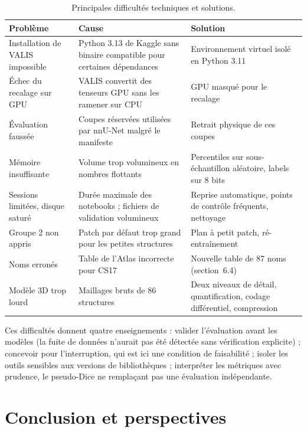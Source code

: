 \documentclass[12pt,a4paper]{report}
\begin{document}
\begin{table}[H]
\centering
\small
\begin{tabular}{p{3.4cm}p{4.9cm}p{5.5cm}}
\toprule
\textbf{Problème} & \textbf{Cause} & \textbf{Solution} \\
\midrule
Installation de VALIS impossible & Python 3.13 de Kaggle sans binaire compatible pour certaines dépendances & Environnement virtuel isolé en Python 3.11 \\
Échec du recalage sur GPU & VALIS convertit des tenseurs GPU sans les ramener sur CPU & GPU masqué pour le recalage \\
Évaluation faussée & Coupes réservées utilisées par nnU-Net malgré le manifeste & Retrait physique de ces coupes \\
Mémoire insuffisante & Volume trop volumineux en nombres flottants & Percentiles sur sous-échantillon aléatoire, labels sur 8 bits \\
Sessions limitées, disque saturé & Durée maximale des notebooks ; fichiers de validation volumineux & Reprise automatique, points de contrôle fréquents, nettoyage \\
Groupe 2 non appris & Patch par défaut trop grand pour les petites structures & Plan à petit patch, ré-entraînement \\
Noms erronés & Table de l'Atlas incorrecte pour CS17 & Nouvelle table de 87 noms (section~6.4) \\
Modèle 3D trop lourd & Maillages bruts de 86 structures & Deux niveaux de détail, quantification, codage différentiel, compression \\
\bottomrule
\end{tabular}
\caption[Difficultés et solutions]{Principales difficultés techniques et solutions.}
\label{tab:difficultes}
\end{table}

Ces difficultés donnent quatre enseignements : valider l'évaluation avant les modèles (la fuite de données n'aurait pas été détectée sans vérification explicite) ; concevoir pour l'interruption, qui est ici une condition de faisabilité ; isoler les outils sensibles aux versions de bibliothèques ; interpréter les métriques avec prudence, le pseudo-Dice ne remplaçant pas une évaluation indépendante.

\chapter*{Conclusion et perspectives}
\end{document}
